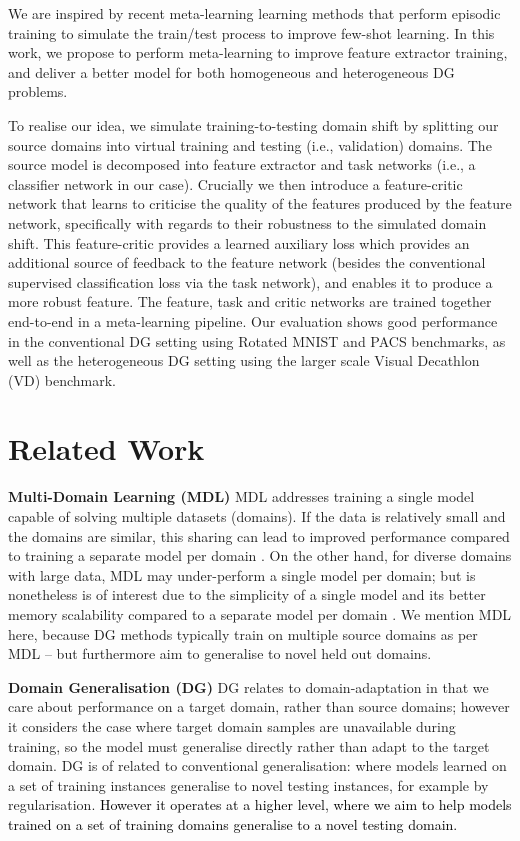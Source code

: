\documentclass{article}
\newcommand{\keypoint}[1]{\vspace{0.0cm}\noindent\textbf{#1}\quad}
\newcommand{\nice}[1]{\textcolor{black}{#1}}
\begin{document}
We are inspired by recent meta-learning learning methods that perform episodic training \cite{Finn17, snell2017prototypicalNets,ravi2017fewShotMeta} to simulate the train/test process to improve few-shot learning. In this work, we propose to perform meta-learning to improve feature extractor training, and deliver a better model for both homogeneous and heterogeneous DG problems. 

To realise our idea, we simulate training-to-testing domain shift  by splitting our source domains into virtual training and testing (i.e., validation) domains. The source model is decomposed into feature extractor  and task networks (i.e., a classifier network in our case). Crucially we then introduce a feature-critic network that learns to criticise the quality of the features produced by the feature network, specifically with regards to their robustness to the simulated domain shift. This feature-critic provides a learned auxiliary loss which provides an additional source of feedback to the feature network (besides the conventional supervised classification loss via the task network), and enables it to produce a more robust feature. The feature, task and critic networks are trained together end-to-end in a meta-learning pipeline. Our evaluation shows good performance in the conventional DG setting using  Rotated MNIST \cite{Ghifary15, Motiian17} and PACS \cite{Lida17} benchmarks, as well as the heterogeneous DG setting using the larger scale  Visual Decathlon (VD) \cite{Rebuffi17} benchmark.

\section{Related Work}

\keypoint{Multi-Domain Learning (MDL)} MDL addresses training a single model capable of solving multiple datasets (domains). If the data is relatively small and the domains are similar, this sharing can lead to improved performance compared to training a separate model per domain \cite{Yang15}. On the other hand, for diverse domains with large data, MDL may under-perform a single model per domain; but is nonetheless is of interest due to the simplicity of a single model and its better memory scalability compared to a separate model per domain \cite{Rebuffi17, Rebuffi18}. We mention MDL here, because  DG methods typically train on multiple source domains as per MDL -- but furthermore aim to generalise to novel held out domains.

\keypoint{Domain Generalisation (DG)} DG relates to domain-adaptation in that we care about performance on a target domain, rather than source domains; however it considers the case where target domain samples are unavailable during training, so the model must generalise directly rather than adapt to the target domain. DG is of related to conventional generalisation: where models learned on a set of training instances  generalise to novel testing instances, for example by regularisation. \nice{However it operates at a higher level, where we aim to help models trained on a set of training domains generalise to a novel testing domain.} 
\end{document}
